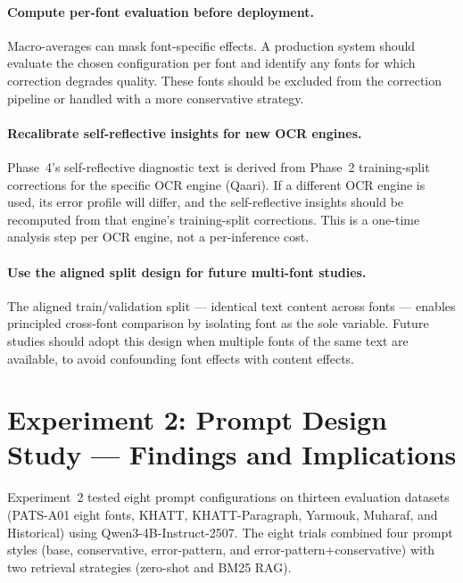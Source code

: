 \paragraph{Compute per-font evaluation before deployment.}
Macro-averages can mask font-specific effects. A production system should
evaluate the chosen configuration per font and identify any fonts for which
correction degrades quality. These fonts should be excluded from the
correction pipeline or handled with a more conservative strategy.

\paragraph{Recalibrate self-reflective insights for new OCR engines.}
Phase~4's self-reflective diagnostic text is derived from Phase~2 training-split
corrections for the specific OCR engine (Qaari). If a different OCR engine
is used, its error profile will differ, and the self-reflective insights
should be recomputed from that engine's training-split corrections. This is
a one-time analysis step per OCR engine, not a per-inference cost.

\paragraph{Use the aligned split design for future multi-font studies.}
The aligned train/validation split --- identical text content across fonts
--- enables principled cross-font comparison by isolating font as the sole
variable. Future studies should adopt this design when multiple fonts of
the same text are available, to avoid confounding font effects with
content effects.

\section{Experiment 2: Prompt Design Study --- Findings and Implications}
\label{sec:disc_exp2}

Experiment~2 tested eight prompt configurations on thirteen evaluation
datasets (PATS-A01 eight fonts, KHATT, KHATT-Paragraph, Yarmouk,
Muharaf, and Historical) using Qwen3-4B-Instruct-2507. The eight trials
combined four prompt styles (base, conservative, error-pattern, and
error-pattern+conservative) with two retrieval strategies (zero-shot and
BM25 RAG).

